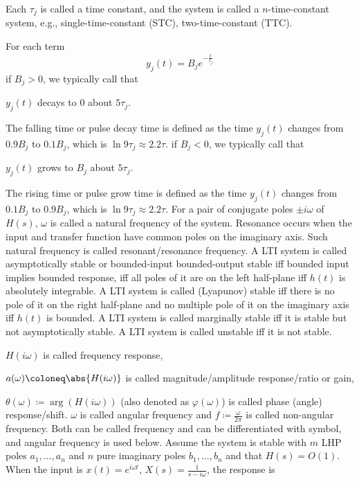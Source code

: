 \documentclass[a4paper,12pt]{report}
\begin{document}
Each $\tau_j$ is called a time constant, and the system is called a $n$-time-constant system, e.g., single-time-constant (STC), two-time-constant (TTC).

For each term
\[y_j(t)=B_je^{-\frac{t}{\tau_j}}\]
if $B_j>0$, we typically call that 
\bit
\item $y_j(t)$ decays to $0$ about $5\tau_j$.
\item The falling time or pulse decay time is defined as the time $y_j(t)$ changes from $0.9B_j$ to $0.1B_j$, which is $\ln 9\tau_j\approx 2.2\tau$.
\eit
if $B_j<0$, we typically call that 
\bit
\item $y_j(t)$ grows to $B_j$ about $5\tau_j$.
\item The rising time or pulse grow time is defined as the time $y_j(t)$ changes from $0.1B_j$ to $0.9B_j$, which is $\ln 9\tau_j\approx 2.2\tau$.
\eit
{}
For a pair of conjugate poles $\pm i\omega$ of $H(s)$, $\omega$ is called a natural frequency of the system.
Resonance occurs when the input and transfer function have common poles on the imaginary axis. Such natural frequency is called resonant/resonance frequency.
A LTI system is called asymptotically stable or bounded-input bounded-output stable iff bounded input implies bounded response, iff all poles of it are on the left half-plane iff $h(t)$ is absolutely integrable.
A LTI system is called (Lyapunov) stable iff there is no pole of it on the right half-plane and no multiple pole of it on the imaginary axis iff $h(t)$ is bounded.
A LTI system is called marginally stable iff it is stable but not asymptotically stable.
A LTI system is called unstable iff it is not stable.
\bit
\item $H(i\omega)$ is called frequency response,
\item $a(\omega)\coloneq\abs{H(i\omega)}$ is called magnitude/amplitude response/ratio or gain,
\item $\theta(\omega)\coloneq\arg(H(i\omega))$ (also denoted as $\varphi(\omega)$) is called phase (angle) response/shift.
\eit
$\omega$ is called angular frequency and $f\coloneq\frac{\omega}{2\pi}$ is called non-angular frequency. Both can be called frequency and can be differentiated with symbol, and angular frequency is used below.
Assume the system is stable with $m$ LHP poles $a_1,\ldots,a_n$ and $n$ pure imaginary poles $b_1,\ldots,b_n$ and that $H(s)=O(1)$. When the input is $x(t)=e^{i\omega t}$, $X(s)=\frac{1}{s-i\omega}$, the response is
\end{document}
